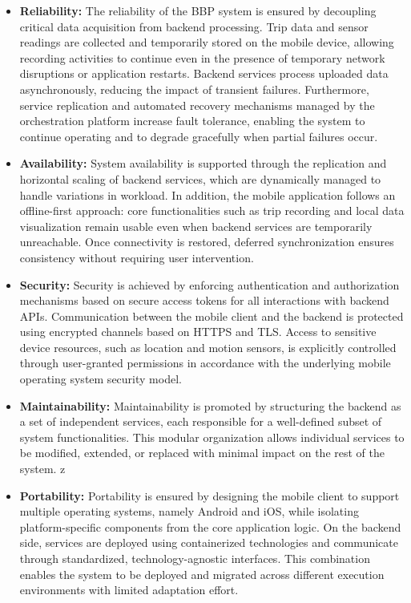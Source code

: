 \begin{itemize}

\item \textbf{Reliability:}  
The reliability of the BBP system is ensured by decoupling critical data acquisition from backend processing. Trip data and sensor readings are collected and temporarily stored on the mobile device, allowing recording activities to continue even in the presence of temporary network disruptions or application restarts. Backend services process uploaded data asynchronously, reducing the impact of transient failures. Furthermore, service replication and automated recovery mechanisms managed by the orchestration platform increase fault tolerance, enabling the system to continue operating and to degrade gracefully when partial failures occur.

\item \textbf{Availability:}  
System availability is supported through the replication and horizontal scaling of backend services, which are dynamically managed to handle variations in workload. In addition, the mobile application follows an offline-first approach: core functionalities such as trip recording and local data visualization remain usable even when backend services are temporarily unreachable. Once connectivity is restored, deferred synchronization ensures consistency without requiring user intervention.

\item \textbf{Security:}  
Security is achieved by enforcing authentication and authorization mechanisms based on secure access tokens for all interactions with backend APIs. Communication between the mobile client and the backend is protected using encrypted channels based on HTTPS and TLS. Access to sensitive device resources, such as location and motion sensors, is explicitly controlled through user-granted permissions in accordance with the underlying mobile operating system security model.

\item \textbf{Maintainability:}  
Maintainability is promoted by structuring the backend as a set of independent services, each responsible for a well-defined subset of system functionalities. This modular organization allows individual services to be modified, extended, or replaced with minimal impact on the rest of the system. z

\item \textbf{Portability:}  
Portability is ensured by designing the mobile client to support multiple operating systems, namely Android and iOS, while isolating platform-specific components from the core application logic. On the backend side, services are deployed using containerized technologies and communicate through standardized, technology-agnostic interfaces. This combination enables the system to be deployed and migrated across different execution environments with limited adaptation effort.

\end{itemize}
